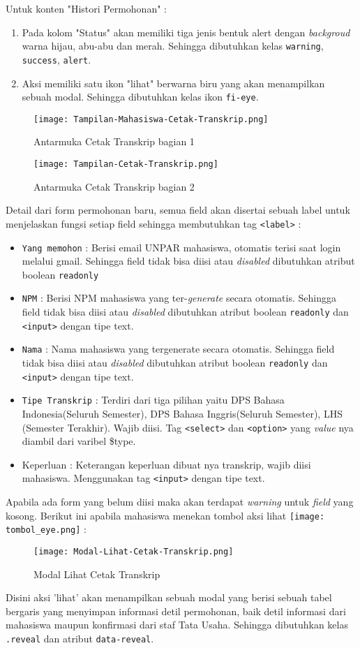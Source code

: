 Untuk konten "Histori Permohonan" :
\begin{enumerate}	
	\item Pada kolom "Status" akan memiliki tiga jenis bentuk alert dengan \textit{backgroud} warna hijau, abu-abu dan merah. Sehingga dibutuhkan kelas \verb|warning|, \verb|success|, \verb|alert|.
	\item Aksi memiliki satu ikon "lihat" berwarna biru yang akan menampilkan sebuah modal. Sehingga dibutuhkan kelas ikon \verb|fi-eye|.
\end{enumerate}
\begin{figure} [H]
	\centering  
	\texttt{[image: Tampilan-Mahasiswa-Cetak-Transkrip.png]}  
	\caption{Antarmuka Cetak Transkrip bagian 1} 
\end{figure}
\begin{figure} [H]
	\centering  
	\texttt{[image: Tampilan-Cetak-Transkrip.png]}  
	\caption{Antarmuka Cetak Transkrip bagian 2} 
\end{figure}
Detail dari form permohonan baru, semua field akan disertai sebuah label untuk menjelaskan fungsi setiap field sehingga membutuhkan tag \texttt{<label>}  :
\begin{itemize}	
	\item \texttt{Yang memohon} : Berisi email UNPAR mahasiswa, otomatis terisi saat login melalui gmail. Sehingga field tidak bisa diisi atau \textit{disabled} dibutuhkan atribut boolean \verb|readonly|
	\item \texttt{NPM} : Berisi NPM mahasiswa yang ter-\textit{generate} secara otomatis. Sehingga field tidak bisa diisi atau \textit{disabled} dibutuhkan atribut boolean \verb|readonly| dan \texttt{<input>} dengan tipe text.
	\item \texttt{Nama} : Nama mahasiswa yang tergenerate secara otomatis. Sehingga field tidak bisa diisi atau \textit{disabled} dibutuhkan atribut boolean \verb|readonly| dan \texttt{<input>} dengan tipe text.
	\item \texttt{Tipe Transkrip} : Terdiri dari tiga pilihan yaitu DPS Bahasa Indonesia(Seluruh Semester), DPS Bahasa Inggris(Seluruh Semester), LHS (Semester Terakhir). Wajib diisi. Tag \texttt{<select>} dan \texttt{<option>} yang \textit{value} nya diambil dari varibel \$type.
	\item Keperluan : Keterangan keperluan dibuat nya transkrip, wajib diisi mahasiswa. Menggunakan tag \texttt{<input>} dengan tipe text.
\end{itemize}
Apabila ada form yang belum diisi maka akan terdapat \textit{warning} untuk \textit{field} yang kosong.
Berikut ini apabila mahasiswa menekan tombol aksi lihat \texttt{[image: tombol\_eye.png]} :
\begin{figure} [H]
	\centering  
	\texttt{[image: Modal-Lihat-Cetak-Transkrip.png]}  
	\caption{Modal Lihat Cetak Transkrip} 
\end{figure}
\noindent Disini aksi 'lihat' akan menampilkan sebuah modal yang berisi sebuah tabel bergaris yang menyimpan informasi detil permohonan, baik detil informasi dari mahasiswa maupun konfirmasi dari staf Tata Usaha. Sehingga dibutuhkan kelas \verb|.reveal| dan atribut \verb|data-reveal|.

